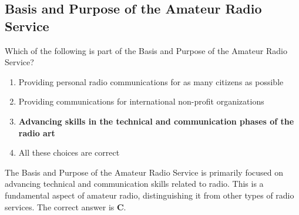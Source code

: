 \subsection{Basis and Purpose of the Amateur Radio Service}
\label{T1A01}

\begin{tcolorbox}[colback=gray!10!white,colframe=black!75!black,title=T1A01]
Which of the following is part of the Basis and Purpose of the Amateur Radio Service?
\begin{enumerate}[label=\Alph*,noitemsep]
    \item Providing personal radio communications for as many citizens as possible
    \item Providing communications for international non-profit organizations
    \item \textbf{Advancing skills in the technical and communication phases of the radio art}
    \item All these choices are correct
\end{enumerate}
\end{tcolorbox}

The Basis and Purpose of the Amateur Radio Service is primarily focused on advancing technical and communication skills related to radio. This is a fundamental aspect of amateur radio, distinguishing it from other types of radio services. The correct answer is \textbf{C}.